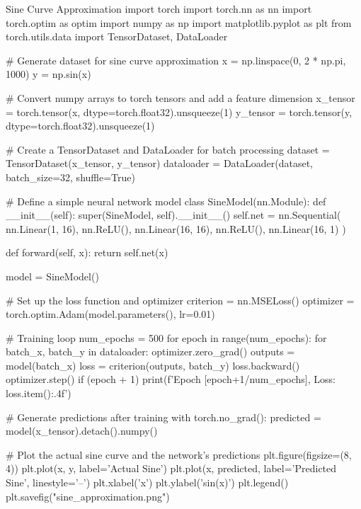 \begin{codeonly}{Sine Curve Approximation}
import torch
import torch.nn as nn
import torch.optim as optim
import numpy as np
import matplotlib.pyplot as plt
from torch.utils.data import TensorDataset, DataLoader

# Generate dataset for sine curve approximation
x = np.linspace(0, 2 * np.pi, 1000)
y = np.sin(x)

# Convert numpy arrays to torch tensors and add a feature dimension
x_tensor = torch.tensor(x, dtype=torch.float32).unsqueeze(1)
y_tensor = torch.tensor(y, dtype=torch.float32).unsqueeze(1)

# Create a TensorDataset and DataLoader for batch processing
dataset = TensorDataset(x_tensor, y_tensor)
dataloader = DataLoader(dataset, batch_size=32, shuffle=True)

# Define a simple neural network model
class SineModel(nn.Module):
    def __init__(self):
        super(SineModel, self).__init__()
        self.net = nn.Sequential(
            nn.Linear(1, 16),
            nn.ReLU(),
            nn.Linear(16, 16),
            nn.ReLU(),
            nn.Linear(16, 1)
        )
    
    def forward(self, x):
        return self.net(x)

model = SineModel()

# Set up the loss function and optimizer
criterion = nn.MSELoss()
optimizer = torch.optim.Adam(model.parameters(), lr=0.01)

# Training loop
num_epochs = 500
for epoch in range(num_epochs):
    for batch_x, batch_y in dataloader:
        optimizer.zero_grad()
        outputs = model(batch_x)
        loss = criterion(outputs, batch_y)
        loss.backward()
        optimizer.step()
    if (epoch + 1) %
        print(f'Epoch [{epoch+1}/{num_epochs}], Loss: {loss.item():.4f}')

# Generate predictions after training
with torch.no_grad():
    predicted = model(x_tensor).detach().numpy()

# Plot the actual sine curve and the network's predictions
plt.figure(figsize=(8, 4))
plt.plot(x, y, label='Actual Sine')
plt.plot(x, predicted, label='Predicted Sine', linestyle='--')
plt.xlabel('x')
plt.ylabel('sin(x)')
plt.legend()
plt.savefig("sine_approximation.png")
\end{codeonly}

